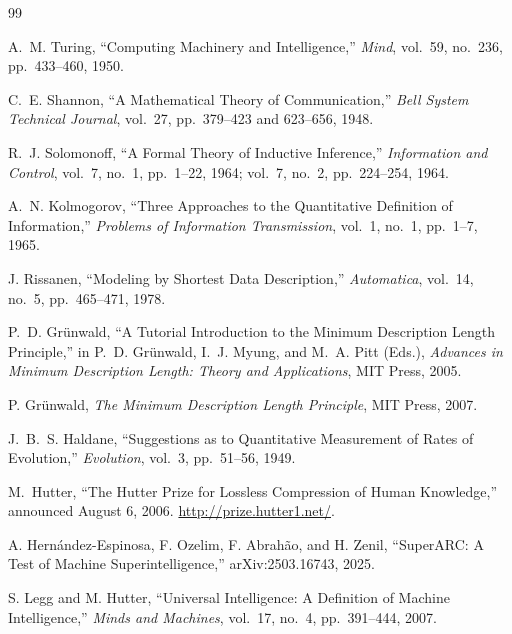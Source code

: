 \documentclass[11pt]{article}
\begin{document}
\begin{thebibliography}{99}

A.~M. Turing,
\newblock ``Computing Machinery and Intelligence,''
\newblock \emph{Mind}, vol.~59, no.~236, pp.~433--460, 1950.

C.~E. Shannon,
\newblock ``A Mathematical Theory of Communication,''
\newblock \emph{Bell System Technical Journal}, vol.~27, pp.~379--423 and 623--656, 1948.

R.~J. Solomonoff,
\newblock ``A Formal Theory of Inductive Inference,''
\newblock \emph{Information and Control}, vol.~7, no.~1, pp.~1--22, 1964;
\newblock vol.~7, no.~2, pp.~224--254, 1964.

A.~N. Kolmogorov,
\newblock ``Three Approaches to the Quantitative Definition of Information,''
\newblock \emph{Problems of Information Transmission}, vol.~1, no.~1, pp.~1--7, 1965.

J. Rissanen,
\newblock ``Modeling by Shortest Data Description,''
\newblock \emph{Automatica}, vol.~14, no.~5, pp.~465--471, 1978.

P.~D. Gr{\"u}nwald,
\newblock ``A Tutorial Introduction to the Minimum Description Length Principle,''
\newblock in P.~D. Gr{\"u}nwald, I.~J. Myung, and M.~A. Pitt (Eds.),
\newblock \emph{Advances in Minimum Description Length: Theory and Applications},
\newblock MIT Press, 2005.

P. Gr{\"u}nwald,
\newblock \emph{The Minimum Description Length Principle},
\newblock MIT Press, 2007.

J.~B.~S. Haldane,
\newblock ``Suggestions as to Quantitative Measurement of Rates of Evolution,''
\newblock \emph{Evolution}, vol.~3, pp.~51--56, 1949.

M.~Hutter,
\newblock ``The Hutter Prize for Lossless Compression of Human Knowledge,''
\newblock announced August 6, 2006.
\newblock \url{http://prize.hutter1.net/}.

A. Hern{\'a}ndez-Espinosa, F. Ozelim, F. Abrah{\~a}o, and H. Zenil,
\newblock ``SuperARC: A Test of Machine Superintelligence,''
\newblock arXiv:2503.16743, 2025.

S. Legg and M. Hutter,
\newblock ``Universal Intelligence: A Definition of Machine Intelligence,''
\newblock \emph{Minds and Machines}, vol.~17, no.~4, pp.~391--444, 2007.


\end{thebibliography}
\end{document}
